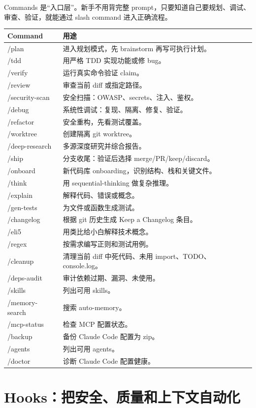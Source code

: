 \documentclass[11pt,a4paper]{ctexbook}
\begin{document}
Commands 是“入口层”。新手不用背完整 prompt，只要知道自己要规划、调试、审查、验证，就能通过 slash command 进入正确流程。

\begin{longtable}{p{}p{}}
\toprule
Command & 用途 \\
\midrule
/plan & 进入规划模式，先 brainstorm 再写可执行计划。 \\
/tdd & 用严格 TDD 实现功能或修 bug。 \\
/verify & 运行真实命令验证 claim。 \\
/review & 审查当前 diff 或指定路径。 \\
/security-scan & 安全扫描：OWASP、secrets、注入、鉴权。 \\
/debug & 系统性调试：复现、隔离、修复、验证。 \\
/refactor & 安全重构，先看测试覆盖。 \\
/worktree & 创建隔离 git worktree。 \\
/deep-research & 多源深度研究并综合报告。 \\
/ship & 分支收尾：验证后选择 merge/PR/keep/discard。 \\
/onboard & 新代码库 onboarding，识别结构、栈和关键文件。 \\
/think & 用 sequential-thinking 做复杂推理。 \\
/explain & 解释代码、错误或概念。 \\
/gen-tests & 为文件或函数生成测试。 \\
/changelog & 根据 git 历史生成 Keep a Changelog 条目。 \\
/eli5 & 用类比给小白解释技术概念。 \\
/regex & 按需求编写正则和测试用例。 \\
/cleanup & 清理当前 diff 中死代码、未用 import、TODO、console.log。 \\
/deps-audit & 审计依赖过期、漏洞、未使用。 \\
/skills & 列出可用 skills。 \\
/memory-search & 搜索 auto-memory。 \\
/mcp-status & 检查 MCP 配置状态。 \\
/backup & 备份 Claude Code 配置为 zip。 \\
/agents & 列出可用 agents。 \\
/doctor & 诊断 Claude Code 配置健康。 \\
\bottomrule
\end{longtable}

\section{Hooks：把安全、质量和上下文自动化}
\end{document}
